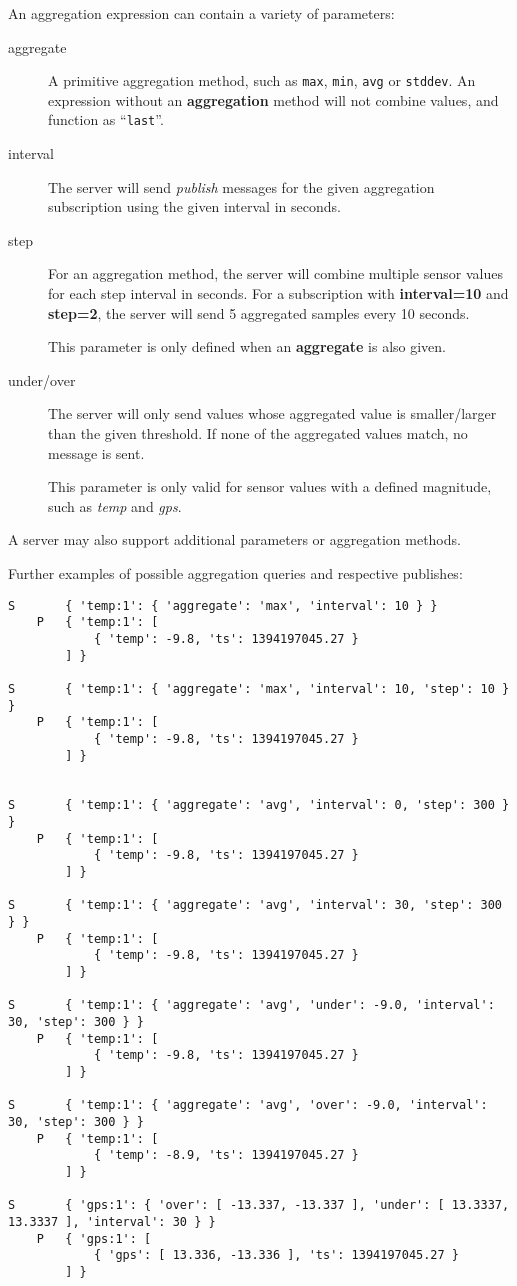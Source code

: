 \documentclass[a4paper]{article}
\begin{document}
An aggregation expression can contain a variety of parameters:

\begin{description}
	\item[aggregate]
		A primitive aggregation method, such as \texttt{max}, \texttt{min}, \texttt{avg} or \texttt{stddev}. 
		An expression without an \textbf{aggregation} method will not combine values, and function as ``\texttt{last}''.
		
	\item[interval]
		The server will send \emph{publish} messages for the given aggregation subscription using the given interval in seconds.
		
	\item[step]
		For an aggregation method, the server will combine multiple sensor values for each step interval in seconds.
		For a subscription with \textbf{interval=10} and \textbf{step=2}, the server will send 5 aggregated samples every 10 seconds.
		
		This parameter is only defined when an \textbf{aggregate} is also given.

	\item[under/over]
		The server will only send values whose aggregated value is smaller/larger than the given threshold.	
		If none of the aggregated values match, no message is sent.
		
		This parameter is only valid for sensor values with a defined magnitude, such as \textit{temp} and \textit{gps}.	
\end{description}

A server may also support additional parameters or aggregation methods.

Further examples of possible aggregation queries and respective publishes:
\begin{verbatim}
S       { 'temp:1': { 'aggregate': 'max', 'interval': 10 } }
    P   { 'temp:1': [
            { 'temp': -9.8, 'ts': 1394197045.27 }
        ] }

S       { 'temp:1': { 'aggregate': 'max', 'interval': 10, 'step': 10 } }
    P   { 'temp:1': [
            { 'temp': -9.8, 'ts': 1394197045.27 }
        ] }


S       { 'temp:1': { 'aggregate': 'avg', 'interval': 0, 'step': 300 } }
    P   { 'temp:1': [
            { 'temp': -9.8, 'ts': 1394197045.27 }
        ] }

S       { 'temp:1': { 'aggregate': 'avg', 'interval': 30, 'step': 300 } }
    P   { 'temp:1': [
            { 'temp': -9.8, 'ts': 1394197045.27 }
        ] }

S       { 'temp:1': { 'aggregate': 'avg', 'under': -9.0, 'interval': 30, 'step': 300 } }
    P   { 'temp:1': [
            { 'temp': -9.8, 'ts': 1394197045.27 }
        ] }

S       { 'temp:1': { 'aggregate': 'avg', 'over': -9.0, 'interval': 30, 'step': 300 } }
    P   { 'temp:1': [
            { 'temp': -8.9, 'ts': 1394197045.27 }
        ] }

S       { 'gps:1': { 'over': [ -13.337, -13.337 ], 'under': [ 13.3337, 13.3337 ], 'interval': 30 } }
    P   { 'gps:1': [
            { 'gps': [ 13.336, -13.336 ], 'ts': 1394197045.27 }
        ] }
\end{verbatim}
\end{document}
